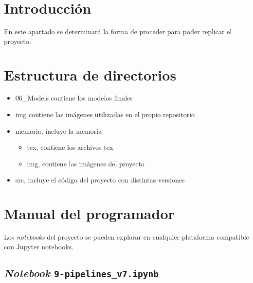 
\section{Introducción}

En este apartado se determinará la forma de proceder para poder replicar el proyecto.

\section{Estructura de directorios}

\begin{itemize}
    \item 06\_Models contiene los modelos finales
    \item img contiene las imágenes utilizadas en el propio repositorio
    \item memoria, incluye la memoria
    \begin{itemize}
        \item tex, contiene los archivos tex
        \item img, contiene las imágenes del proyecto
    \end{itemize}
        \item src, incluye el código del proyecto con distintas versiones
\end{itemize}

\section{Manual del programador}


Los \textit{notebooks} del proyecto se pueden explorar en cualquier plataforma compatible con Jupyter notebooks.

\subsection{\textit{Notebook} \texttt{9-pipelines\_v7.ipynb}} \label{anx:pipeline}

